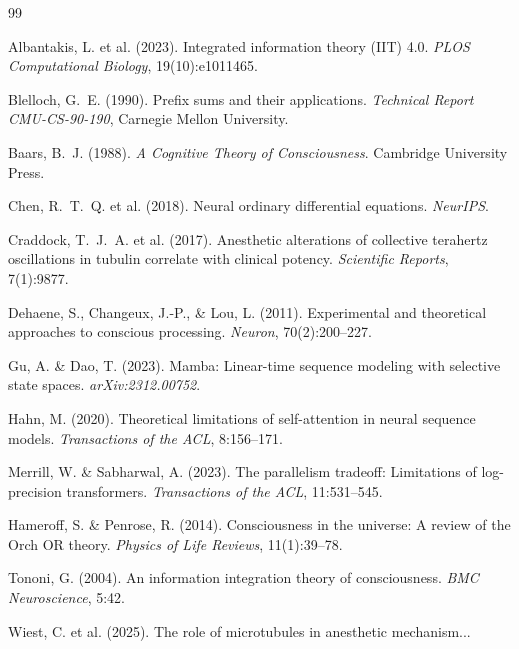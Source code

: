 \documentclass[11pt]{article}
\theoremstyle{definition}
\begin{document}

\begin{thebibliography}{99}

Albantakis, L. et al. (2023). Integrated information theory (IIT) 4.0. \textit{PLOS Computational Biology}, 19(10):e1011465.

Blelloch, G.~E. (1990). Prefix sums and their applications. \textit{Technical Report CMU-CS-90-190}, Carnegie Mellon University.

Baars, B.~J. (1988). \textit{A Cognitive Theory of Consciousness}. Cambridge University Press.

Chen, R.~T.~Q. et al. (2018). Neural ordinary differential equations. \textit{NeurIPS}.

Craddock, T.~J.~A. et al. (2017). Anesthetic alterations of collective terahertz oscillations in tubulin correlate with clinical potency. \textit{Scientific Reports}, 7(1):9877.

Dehaene, S., Changeux, J.-P., \& Lou, L. (2011). Experimental and theoretical approaches to conscious processing. \textit{Neuron}, 70(2):200--227.

Gu, A. \& Dao, T. (2023). Mamba: Linear-time sequence modeling with selective state spaces. \textit{arXiv:2312.00752}.

Hahn, M. (2020). Theoretical limitations of self-attention in neural sequence models. \textit{Transactions of the ACL}, 8:156--171.

Merrill, W. \& Sabharwal, A. (2023). The parallelism tradeoff: Limitations of log-precision transformers. \textit{Transactions of the ACL}, 11:531--545.

Hameroff, S. \& Penrose, R. (2014). Consciousness in the universe: A review of the Orch OR theory. \textit{Physics of Life Reviews}, 11(1):39--78.

Tononi, G. (2004). An information integration theory of consciousness. \textit{BMC Neuroscience}, 5:42.

Wiest, C. et al. (2025). The role of microtubules in anesthetic mechanism...
\end{thebibliography}
\end{document}
